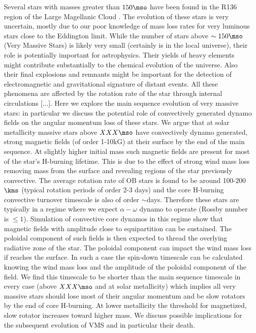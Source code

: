 Several stars with masses greater than $150\mso$ have been found in the R136 region of the Large Magellanic Cloud  \cite{sof_Parker_Goodwin_Kassim_2010}. The evolution of these stars is very uncertain, mostly due to our poor knowledge of mass loss rates for very luminous stars close to the Eddington limit. While the number of stars above $\sim 150\mso$ (Very Massive Stars) is likely very small (certainly is in the local universe), their role is potentially important for astrophysics. Their yields of heavy elements might contribute substantially to the chemical evolution of the universe. Also their final explosions and remnants might be important for the detection of electromagnetic and gravitational signature of distant events. All these phenomena are affected by the rotation rate of the star through internal circulations [...]. Here we explore the main sequence evolution of very massive stars: in particular we discuss the potential role of convectively generated dynamo fields on the angular momentum loss of these stars. We argue that at solar metallicity massive stars above $XXX\mso$ have convectively dynamo generated, strong magnetic fields (of order 1-10kG) at their surface by the end of the main sequence. At slightly higher initial mass such magnetic fields are present for most of the star's H-burning lifetime. This is due to the effect of strong wind mass loss removing mass from the surface and revealing regions of the star previously convective. The average rotation rate of OB stars is found to be around 100-200$\kms$ (typical rotation periods of order 2-3 days) and the core H-burning convective turnover timescale is also of order $\sim$days. Therefore these stars are typically in a regime where we expect $\alpha-\omega$ dynamo to operate (Rossby number is $\le 1$). Simulation of convective core dynamos in this regime show that magnetic fields with amplitude close to equipartition can be sustained. The poloidal component of such fields is then expected to thread the overlying radiative zone of the star. The poloidal component can impact the wind mass loss if reaches the surface.  In such a case the spin-down timescale can be calculated knowing the wind mass loss and the amplitude of the poloidal component of the field. We find this timescale to be shorter than the main sequence timescale in every case (above $XXX\mso$ and at solar metallicity) which implies all very massive stars should lose most of their angular momentum and be slow rotators by the end of core H-burning. At lower metallicity the threshold for magnetized, slow rotator increases toward higher mass. We discuss possible implications for the subsequent evolution of VMS and in particular their death. 